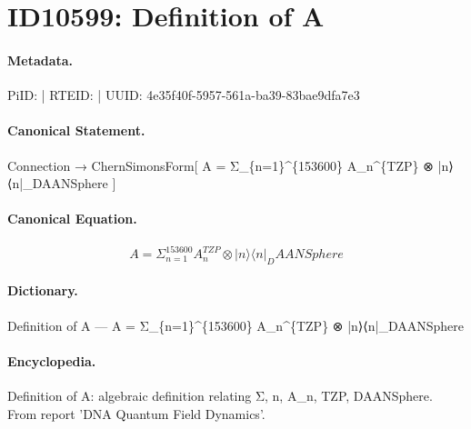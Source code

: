 \section*{ID10599: Definition of A}
\paragraph{Metadata.}
PiID:  | RTEID:  | UUID: 4e35f40f-5957-561a-ba39-83bae9dfa7e3

\paragraph{Canonical Statement.}
Connection → ChernSimonsForm[ A = Σ\_\{n=1\}\textasciicircum{}\{153600\} A\_n\textasciicircum{}\{TZP\} ⊗ |n⟩⟨n|\_DAANSphere ]

\paragraph{Canonical Equation.}
\[
A = Σ_{n=1}^{153600} A_n^{TZP} ⊗ |n⟩⟨n|_DAANSphere
\]

\paragraph{Dictionary.}
Definition of A — A = Σ\_\{n=1\}\textasciicircum{}\{153600\} A\_n\textasciicircum{}\{TZP\} ⊗ |n⟩⟨n|\_DAANSphere

\paragraph{Encyclopedia.}
Definition of A: algebraic definition relating Σ, n, A\_n, TZP, DAANSphere. From report 'DNA Quantum Field Dynamics'.
